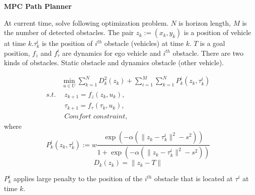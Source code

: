 \documentclass[12pt]{article}
\begin{document}

\noindent
\begin{center}
 \textbf{MPC Path 	Planner}
\vspace{0.5cm}
\noindent
\vspace{0.5cm}
\end{center}

At current time, solve following optimization problem. $N$ is horizon length, $M$ is the number of detected obstacles. The pair $z_k:=(x_k,y_k)$ is a position of vehicle at time $k$.$\tau^i_k$ is the position of $i^{th}$ obstacle (vehicles) at time $k$. $T$ is a goal position, $f_z$ and $f^i_{\tau}$ are dynamics for ego vehicle and $i^{th}$ obstacle. There are two kinds of obstacles. Static obstacle and dynamics obstacle (other vehicle).

\begin{equation}
\begin{split}
&\min_{u\in U}\sum_{k=1}^ND^2_k(z_k)+\sum_{i=1}^M\sum_{k=1}^NP_k^i(z_k,\tau^i_k)\\
s.t.&~~z_{k+1}=f_z(z_k,u_k),\\
&~~\tau_{k+1}=f_\tau(\tau_k,u_k),\\
&~~\textit{Comfort constraint},
\end{split}
\end{equation}
where
\begin{equation}
\label{penalty}
P_k^i(z_k,\tau^i_k) := w\frac{\exp(-\alpha(\|z_k-\tau_k^i\|^2-s^2))}{1+\exp(-\alpha(\|z_k-\tau_k^i\|^2-s^2))}
\end{equation}
\begin{equation}
D_k(z_k)=\|z_k - T \|
\end{equation}


$P_k^i$ applies large penalty to the position of the $i^{th}$ obstacle that is located at $\tau^i$ at time $k$. 
\end{document}
